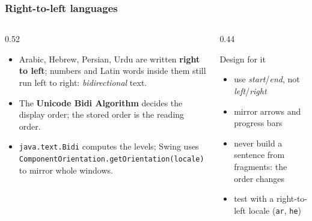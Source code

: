 \documentclass[aspectratio=169,10pt,compress]{beamer}
\begin{document}
\begin{frame}[t,fragile] \frametitle{Right-to-left languages}
  \begin{columns}[T]
    \begin{column}{0.52\textwidth}
      \begin{itemize}\small
        \item Arabic, Hebrew, Persian, Urdu are written \textbf{right to left}; numbers and Latin words inside
          them still run left to right: \emph{bidirectional} text.
        \item The \textbf{Unicode Bidi Algorithm} decides the display order; the stored order is the reading order.
        \item \texttt{java.text.Bidi} computes the levels; Swing uses
          \texttt{ComponentOrientation.getOrientation(locale)} to mirror whole windows.
      \end{itemize}
    \end{column}
    \begin{column}{0.44\textwidth}
      \begin{block}{Design for it}
        \small
        \begin{itemize}
          \item use \emph{start}/\emph{end}, not \emph{left}/\emph{right}
          \item mirror arrows and progress bars
          \item never build a sentence from fragments: the order changes
          \item test with a right-to-left locale (\texttt{ar}, \texttt{he})
        \end{itemize}
      \end{block}
    \end{column}
  \end{columns}
\end{frame}

\end{document}
